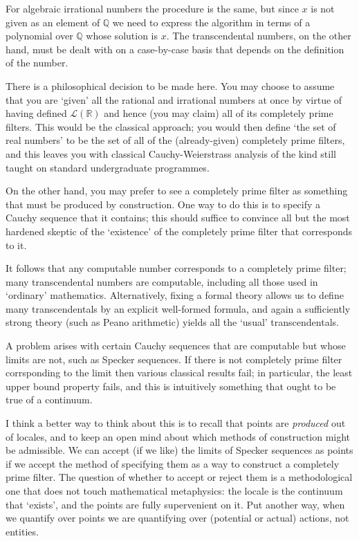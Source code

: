 \documentclass[oneside,english]{amsbook}
\numberwithin{section}{chapter}
\theoremstyle{plain}
\theoremstyle{definition}
\begin{document}
For algebraic irrational numbers the procedure is the same, but since $x$ is not given as an element of $\mathbb{Q}$ we need to express the algorithm in terms of a polynomial over $\mathbb{Q}$ whose solution is $x$. The transcendental numbers, on the other hand, must be dealt with on a case-by-case basis that depends on the definition of the number. 

There is a philosophical decision to be made here. You may choose to assume that you are `given' all the rational and irrational numbers at once by virtue of having defined $\mathscr{L}(\mathbb{R})$ and hence (you may claim) all of its completely prime filters. This would be the classical approach; you would then define `the set of real numbers' to be the set of all of the (already-given) completely prime filters, and this leaves you with classical Cauchy-Weierstrass analysis of the kind still taught on standard undergraduate programmes. 

On the other hand, you may prefer to see a completely prime filter as something that must be produced by construction. One way to do this is to specify a Cauchy sequence that it contains; this should suffice to convince all but the most hardened skeptic of the `existence' of the completely prime filter that corresponds to it. 

It follows that any computable number corresponds to a completely prime filter; many transcendental numbers are computable, including all those used in `ordinary' mathematics. Alternatively, fixing a formal theory allows us to define many transcendentals by an explicit well-formed formula, and again a sufficiently strong theory (such as Peano arithmetic) yields all the `usual' transcendentals. 

A problem arises with certain Cauchy sequences that are computable but whose limits are not, such as Specker sequences. If there is not completely prime filter corrsponding to the limit then various classical results fail; in particular, the least upper bound property fails, and this is intuitively something that ought to be true of a continuum. 

I think a better way to think about this is to recall that points are \emph{produced} out of locales, and to keep an open mind about which methods of construction might be admissible. We can accept (if we like) the limits of Specker sequences as points if we accept the method of specifying them as a way to construct a completely prime filter. The question of whether to accept or reject them is a methodological one that does not touch mathematical metaphysics: the locale is the continuum that `exists', and the points are fully supervenient on it. Put another way, when we quantify over points we are quantifying over (potential or actual) actions, not entities.
\end{document}
